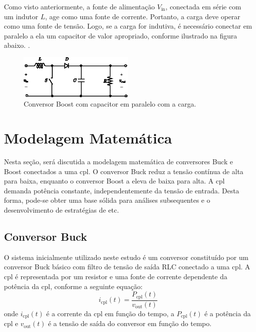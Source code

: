 Como visto anteriormente, a fonte de alimentação $V_{\mathrm{in}}$, conectada em série com um indutor $L$, age como uma fonte de corrente. Portanto, a carga deve operar como uma fonte de tensão. Logo, se a carga for indutiva, é necessário conectar em paralelo a ela um capacitor de valor apropriado, conforme ilustrado na figura abaixo. \cite{martins2008}.

\begin{figure}[H]
  \centering
  \includegraphics[width=0.5\textwidth]{figuras/boost_converter_capacitor.eps}
  \caption{Conversor Boost com capacitor em paralelo com a carga.}
  \label{fig:boost_converter_capacitor}
\end{figure}

\section{Modelagem Matemática}

Nesta seção, será discutida a modelagem matemática de conversores Buck e Boost conectados a uma \acrshort{cpl}. O conversor Buck reduz a tensão contínua de alta para baixa, enquanto o conversor Boost a eleva de baixa para alta. A \acrshort{cpl} demanda potência constante, independentemente da tensão de entrada. Desta forma, pode-se obter uma base sólida para análises subsequentes e o desenvolvimento de estratégias de \acrshort{etc}.

\subsection{Conversor Buck}

O sistema inicialmente utilizado neste estudo é um conversor constituído por um conversor Buck básico com filtro de tensão de saída RLC conectado a uma \acrshort{cpl}. A \acrshort{cpl} é representada por um resistor e uma fonte de corrente dependente da potência da \acrshort{cpl}, conforme a seguinte equação: \begin{equation} i_{\mathrm{cpl}}(t) = \frac{P_{\mathrm{cpl}}(t)}{v_{\mathrm{out}}(t)} \label{eq:cpl_current} \end{equation} onde $i_{\mathrm{cpl}}(t)$ é a corrente da \acrshort{cpl} em função do tempo, a $P_{\mathrm{cpl}}(t)$ é a potência da \acrshort{cpl} e $v_{\mathrm{out}}(t)$ é a tensão de saída do conversor em função do tempo.

